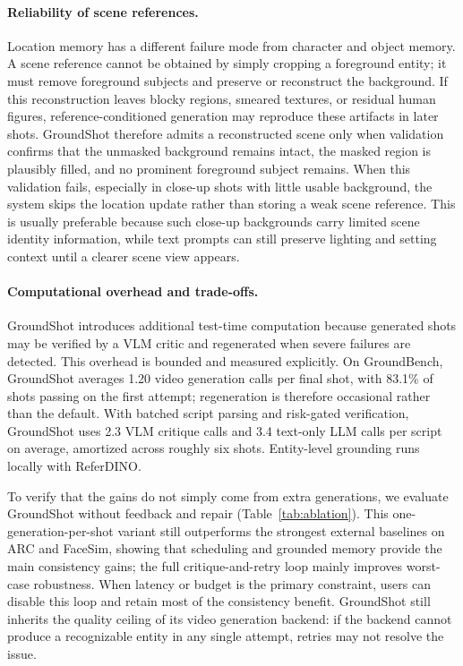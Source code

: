 \paragraph{Reliability of scene references.}
Location memory has a different failure mode from character and object memory. A scene reference cannot be obtained by simply cropping a foreground entity; it must remove foreground subjects and preserve or reconstruct the background. If this reconstruction leaves blocky regions, smeared textures, or residual human figures, reference-conditioned generation may reproduce these artifacts in later shots. GroundShot therefore admits a reconstructed scene only when validation confirms that the unmasked background remains intact, the masked region is plausibly filled, and no prominent foreground subject remains. When this validation fails, especially in close-up shots with little usable background, the system skips the location update rather than storing a weak scene reference. This is usually preferable because such close-up backgrounds carry limited scene identity information, while text prompts can still preserve lighting and setting context until a clearer scene view appears.

\paragraph{Computational overhead and trade-offs.}
GroundShot introduces additional test-time computation because generated shots may be verified by a VLM critic and regenerated when severe failures are detected. This overhead is bounded and measured explicitly. On GroundBench, GroundShot averages 1.20 video generation calls per final shot, with 83.1\% of shots passing on the first attempt; regeneration is therefore occasional rather than the default.
With batched script parsing and risk-gated verification, GroundShot uses 2.3 VLM critique calls and 3.4 text-only LLM calls per script on average, amortized across roughly six shots. Entity-level grounding runs locally with ReferDINO.

To verify that the gains do not simply come from extra generations, we evaluate GroundShot without feedback and repair (Table~\ref{tab:ablation}). This one-generation-per-shot variant still outperforms the strongest external baselines on ARC and FaceSim, showing that scheduling and grounded memory provide the main consistency gains; the full critique-and-retry loop mainly improves worst-case robustness. When latency or budget is the primary constraint, users can disable this loop and retain most of the consistency benefit. GroundShot still inherits the quality ceiling of its video generation backend: if the backend cannot produce a recognizable entity in any single attempt, retries may not resolve the issue.
